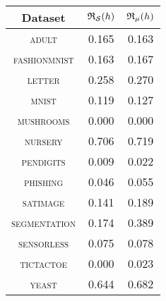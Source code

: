 \begin{tabular}{c|cc}
\toprule
Dataset & {\scriptsize $\mathfrak{R}_{\mathcal{S}}(h)$} & {\scriptsize $\mathfrak{R}_{\mu}(h)$} \\
\midrule
\textsc{\footnotesize adult} & 0.165 & 0.163 \\
\textsc{\footnotesize fashionmnist} & 0.163 & 0.167 \\
\textsc{\footnotesize letter} & 0.258 & 0.270 \\
\textsc{\footnotesize mnist} & 0.119 & 0.127 \\
\textsc{\footnotesize mushrooms} & 0.000 & 0.000 \\
\textsc{\footnotesize nursery} & 0.706 & 0.719 \\
\textsc{\footnotesize pendigits} & 0.009 & 0.022 \\
\textsc{\footnotesize phishing} & 0.046 & 0.055 \\
\textsc{\footnotesize satimage} & 0.141 & 0.189 \\
\textsc{\footnotesize segmentation} & 0.174 & 0.389 \\
\textsc{\footnotesize sensorless} & 0.075 & 0.078 \\
\textsc{\footnotesize tictactoe} & 0.000 & 0.023 \\
\textsc{\footnotesize yeast} & 0.644 & 0.682 \\
\bottomrule
\end{tabular}

